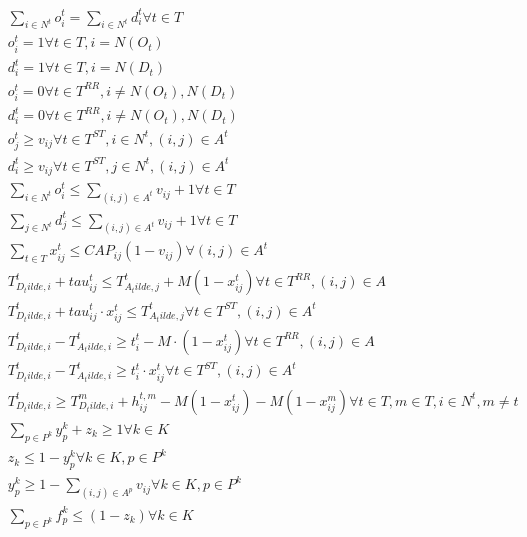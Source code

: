 \begin{align}
  & \sum_{i \in N^{t}} o_{i}^{t} = \sum_{i \in N^{t}} d_{i}^{t} \forall t \in T \tag{eq\_0002} \\
  & o_{i}^{t} = 1 \forall t \in T , i = N \left(O_{t}\right) \tag{eq\_0003} \\
  & d_{i}^{t} = 1 \forall t \in T , i = N \left(D_{t}\right) \tag{eq\_0004} \\
  & o_{i}^{t} = 0 \forall t \in T^{R R} , i \neq N \left(O_{t}\right) , N \left(D_{t}\right) \tag{eq\_0005} \\
  & d_{i}^{t} = 0 \forall t \in T^{R R} , i \neq N \left(O_{t}\right) , N \left(D_{t}\right) \tag{eq\_0006} \\
  & o_{j}^{t} \geq v_{i j} \forall t \in T^{S T} , i \in N^{t} , \left(i , j\right) \in A^{t} \tag{eq\_0007} \\
  & d_{i}^{t} \geq v_{i j} \forall t \in T^{S T} , j \in N^{t} , \left(i , j\right) \in A^{t} \tag{eq\_0008} \\
  & \sum_{i \in N^{t}} o_{i}^{t} \leq \sum_{\left(i , j\right) \in A^{t}} v_{i j} + 1 \forall t \in T \tag{eq\_0009} \\
  & \sum_{j \in N^{t}} d_{j}^{t} \leq \sum_{\left(i , j\right) \in A^{t}} v_{i j} + 1 \forall t \in T \tag{eq\_0010} \\
  & \sum_{t \in T} x_{i j}^{t} \leq \mathit{CAP}_{i j} \left(1 - v_{i j}\right) \forall \left(i , j\right) \in A^{t} \tag{eq\_0011} \\
  & T_{D_tilde , i}^{t} + \mathit{tau}_{i j}^{t} \leq T_{A_tilde , j}^{t} + M \left(1 - x_{i j}^{t}\right) \forall t \in T^{R R} , \left(i , j\right) \in A \tag{eq\_0014} \\
  & T_{D_tilde , i}^{t} + \mathit{tau}_{i j}^{t} \cdot x_{i j}^{t} \leq T_{A_tilde , j}^{t} \forall t \in T^{S T} , \left(i , j\right) \in A^{t} \tag{eq\_0015} \\
  & T_{D_tilde , i}^{t} - T_{A_tilde , i}^{t} \geq t_{i}^{t} - M \cdot \left(1 - x_{i j}^{t}\right) \forall t \in T^{R R} , \left(i , j\right) \in A \tag{eq\_0017} \\
  & T_{D_tilde , i}^{t} - T_{A_tilde , i}^{t} \geq t_{i}^{t} \cdot x_{i j}^{t} \forall t \in T^{S T} , \left(i , j\right) \in A^{t} \tag{eq\_0018} \\
  & T_{D_tilde , i}^{t} \geq T_{D_tilde , i}^{m} + h_{i j}^{t , m} - M \left(1 - x_{i j}^{t}\right) - M \left(1 - x_{i j}^{m}\right) \forall t \in T , m \in T , i \in N^{t} , m \neq t \tag{eq\_0019} \\
  & \sum_{p \in P^{k}} y_{p}^{k} + z_{k} \geq 1 \forall k \in K \tag{eq\_0021} \\
  & z_{k} \leq 1 - y_{p}^{k} \forall k \in K , p \in P^{k} \tag{eq\_0022} \\
  & y_{p}^{k} \geq 1 - \sum_{\left(i , j\right) \in A^{p}} v_{i j} \forall k \in K , p \in P^{k} \tag{eq\_0023} \\
  & \sum_{p \in P^{k}} f_{p}^{k} \leq \left(1 - z_{k}\right) \forall k \in K \tag{eq\_0025} \\
\end{align}
